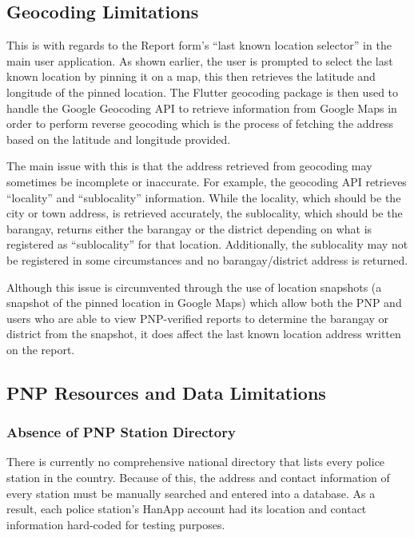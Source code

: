 \subsection{Geocoding Limitations}

This is with regards to the Report form’s “last known location selector” in the main user application. As shown earlier, the user is prompted to select the last known location by pinning it on a map, this then retrieves the latitude and longitude of the pinned location. The Flutter geocoding package is then used to handle the Google Geocoding API to retrieve information from Google Maps in order to perform reverse geocoding which is the process of fetching the address based on the latitude and longitude provided. 

The main issue with this is that the address retrieved from geocoding may sometimes be incomplete or inaccurate. For example, the geocoding API retrieves “locality” and “sublocality” information. While the locality, which should be the city or town address, is retrieved accurately, the sublocality, which should be the barangay, returns either the barangay or the district depending on what is registered as “sublocality” for that location. Additionally, the sublocality may not be registered in some circumstances and no barangay/district address is returned. 

Although this issue is circumvented through the use of location snapshots (a snapshot of the pinned location in Google Maps) which allow both the PNP and users who are able to view PNP-verified reports to determine the barangay or district from the snapshot, it does affect the last known location address written on the report.

\subsection{PNP Resources and Data Limitations}

\subsubsection{Absence of PNP Station Directory}

There is currently no comprehensive national directory that lists every police station in the country. Because of this, the address and contact information of every station must be manually searched and entered into a database. As a result, each police station’s HanApp account had its location and contact information hard-coded for testing purposes.


